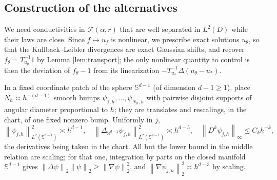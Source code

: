\documentclass[12pt]{article}
\numberwithin{equation}{section}
\newcommand{\norm}[1]{\left\|#1\right\|}
\newcommand{\Sp}{\mathbb S^{d-1}}
\begin{document}
\subsection{Construction of the alternatives}

We need conductivities in $\mathcal F(\alpha,r)$ that are well
separated in $L^2(D)$ while their laws are close. Since
$f\mapsto u_f$ is nonlinear, we prescribe exact solutions $u_\theta$,
so that the Kullback--Leibler divergences are exact Gaussian shifts,
and recover $f_\theta=T_{u_\theta}^{-1}1$ by Lemma
\ref{lem:transport}; the only nonlinear quantity to control is then
the deviation of $f_\theta-1$ from its linearization
$-T_{u_*}^{-1}\Delta(u_\theta-u_*)$.

In a fixed coordinate patch of the sphere $\Sp$ (of dimension
$d-1\ge1$), place $N_h\asymp h^{-(d-1)}$ smooth bumps
$\psi_{1,h},\ldots,\psi_{N_h,h}$ with pairwise disjoint supports of
angular diameter proportional to $h$; they are translates and
rescalings, in the chart, of one fixed nonzero bump. Uniformly in $j$,
\begin{equation}\label{eq:angularbumps}
 \norm{\psi_{j,h}}_{L^2(\Sp)}^2\asymp h^{d-1},\quad
 \norm{\Delta_{\Sp}\psi_{j,h}}_{L^2(\Sp)}^2\asymp h^{d-5},
 \quad \norm{D^k\psi_{j,h}}_\infty\le C_kh^{-k},
\end{equation}
the derivatives being taken in the chart. All but the lower bound in
the middle relation are scaling; for that
one, integration by parts on the closed manifold $\Sp$ gives
$\norm{\Delta\psi}_2\norm\psi_2\ge\norm{\nabla\psi}_2^2$, and
$\norm{\nabla\psi_{j,h}}_2^2\asymp h^{d-3}$ by scaling.
\end{document}
